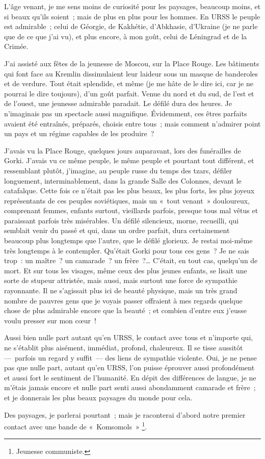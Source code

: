 \documentclass[french,twoside]{book} %
\begin{document}
\noindent L’âge venant, je me sens moins de curiosité pour les paysages, beaucoup moins, et si beaux qu’ils soient ; mais de plus en plus pour les hommes. En URSS le peuple est admirable ; celui de Géorgie, de Kakhétie, d’Abkhasie, d’Ukraine (je ne parle que de ce que j’ai vu), et plus encore, à mon goût, celui de Léningrad et de la Crimée.\par
J’ai assisté aux fêtes de la jeunesse de Moscou, sur la Place Rouge. Les bâtiments qui font face au Kremlin dissimulaient leur laideur sous un masque de banderoles et de verdure. Tout était splendide, et même (je me hâte de le dire ici, car je ne pourrai le dire toujours), d’un goût parfait. Venue du nord et du sud, de l’est et de l’ouest, une jeunesse admirable paradait. Le défilé dura des heures. Je n’imaginais pas un spectacle aussi magnifique. Évidemment, ces êtres parfaits avaient été entraînés, préparés, choisis entre tous ; mais comment n’admirer point un pays et un régime capables de les produire ?\par
J’avais vu la Place Rouge, quelques jours auparavant, lors des funérailles de Gorki. J’avais vu ce même peuple, le même peuple et pourtant tout différent, et ressemblant plutôt, j’imagine, au peuple russe du temps des tzars, défiler longuement, interminablement, dans la grande Salle des Colonnes, devant le catafalque. Cette fois ce n’était pas les plus beaux, les plus forts, les plus joyeux représentants de ces peuples soviétiques, mais un « tout venant » douloureux, comprenant femmes, enfants surtout, vieillards parfois, presque tous mal vêtus et paraissant parfois très misérables. Un défilé silencieux, morne, recueilli, qui semblait venir du passé et qui, dans un ordre parfait, dura certainement beaucoup plus longtemps que l’autre, que le défilé glorieux. Je restai moi-même très longtemps à le contempler. Qu’était Gorki pour tous ces gens ? Je ne sais trop : un maître ? un camarade ? un frère ?… C’était, en tout cas, quelqu’un de mort. Et sur tous les visages, même ceux des plus jeunes enfants, se lisait une sorte de stupeur attristée, mais aussi, mais surtout une force de sympathie rayonnante. Il ne s’agissait plus ici de beauté physique, mais un très grand nombre de pauvres gens que je voyais passer offraient à mes regards quelque chose de plus admirable encore que la beauté ; et combien d’entre eux j’eusse voulu presser sur mon cœur !\par
Aussi bien nulle part autant qu’en URSS, le contact avec tous et n’importe qui, ne s’établit plus aisément, immédiat, profond, chaleureux. Il se tisse aussitôt — parfois un regard y suffit — des liens de sympathie violente. Oui, je ne pense pas que nulle part, autant qu’en URSS, l’on puisse éprouver aussi profondément et aussi fort le sentiment de l’humanité. En dépit des différences de langue, je ne m’étais jamais encore et nulle part senti aussi abondamment camarade et frère ; et je donnerais les plus beaux paysages du monde pour cela.\par
Des paysages, je parlerai pourtant ; mais je raconterai d’abord notre premier contact avec une bande de « Komsomols » \footnote{Jeunesse communiste.}.\par
\end{document}
